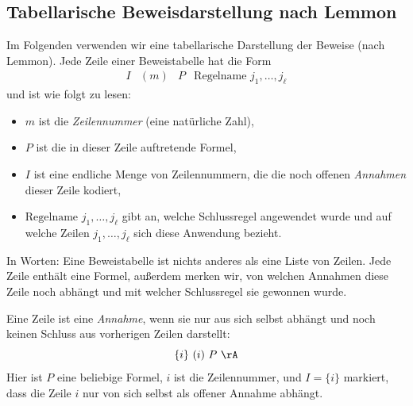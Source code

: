 \documentclass[main.tex]{subfiles}
\begin{document}
\subsection{Tabellarische Beweisdarstellung nach Lemmon}

Im Folgenden verwenden wir eine tabellarische Darstellung der Beweise
(nach Lemmon). Jede Zeile einer Beweistabelle hat die Form
\[
  \begin{array}{llll}
    I & (m) & P & \text{Regelname } j_1,\dots,j_\ell
  \end{array}
\]
und ist wie folgt zu lesen:
\begin{itemize}
  \item \(m\) ist die \emph{Zeilennummer} (eine natürliche Zahl),
  \item \(P\) ist die in dieser Zeile auftretende Formel,
  \item \(I\) ist eine endliche Menge von Zeilennummern, die die noch offenen
        \emph{Annahmen} dieser Zeile kodiert,
  \item \(\text{Regelname } j_1,\dots,j_\ell\) gibt an, welche Schlussregel
        angewendet wurde und auf welche Zeilen \(j_1,\dots,j_\ell\) sich diese
        Anwendung bezieht.
\end{itemize}

In Worten: Eine Beweistabelle ist nichts anderes als eine Liste
von Zeilen. Jede Zeile enthält eine Formel, außerdem merken wir,
von welchen Annahmen diese Zeile noch abhängt und mit welcher
Schlussregel sie gewonnen wurde.

Eine Zeile ist eine \emph{Annahme}, wenn sie nur aus sich selbst abhängt und
noch keinen Schluss aus vorherigen Zeilen darstellt:
\[
  \{i\} \ (i)\ P \ \rA
\]
Hier ist \(P\) eine beliebige Formel, \(i\) ist die Zeilennummer, und
\(I=\{i\}\) markiert, dass die Zeile \(i\) nur von sich selbst als offener
Annahme abhängt.
\end{document}
